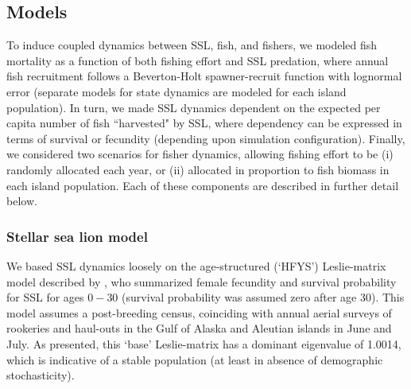 \documentclass[nonumbib,leqno]{nrc1}
\begin{document}
\subsection{Models}


To induce coupled dynamics between SSL, fish, and fishers, we modeled
fish mortality as a function of both fishing effort and SSL predation, where annual fish recruitment follows a Beverton-Holt spawner-recruit function \citep{BevertonHolt1957} with lognormal error (separate models for state dynamics are modeled for each island population).  In turn, we made SSL dynamics dependent on the expected per capita number of fish ``harvested" by SSL, where dependency can be expressed in terms of survival or fecundity (depending upon simulation configuration).  Finally, we considered two scenarios for fisher dynamics, allowing fishing effort to be (i) randomly allocated each year, or (ii) allocated in proportion to fish biomass in each island population.  Each of these components are described in further detail below.


\subsubsection{Stellar sea lion model}

We based SSL dynamics loosely on the age-structured (`HFYS') Leslie-matrix model described by \citet{HolmesEtAl2007}, who summarized female fecundity and survival probability for SSL for ages $0-30$ (survival probability was assumed zero after age 30).  This model assumes a post-breeding census, coinciding with annual aerial surveys of rookeries and haul-outs in the Gulf of Alaska and Aleutian islands in June and July.  As presented, this `base' Leslie-matrix has a dominant eigenvalue of 1.0014, which is indicative of a stable population (at least in absence of demographic stochasticity).
\end{document}
